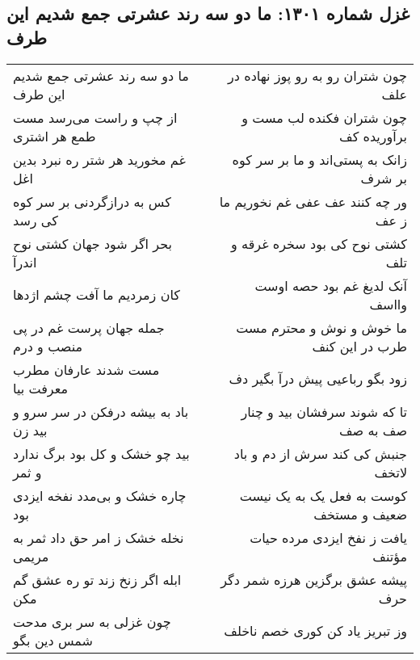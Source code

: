 \begin{center}
\section*{غزل شماره ۱۳۰۱: ما دو سه رند عشرتی جمع شدیم این طرف}
\label{sec:1301}
\begin{longtable}{l p{0.5cm} r}
ما دو سه رند عشرتی جمع شدیم این طرف
&&
چون شتران رو به رو پوز نهاده در علف
\\
از چپ و راست می‌رسد مست طمع هر اشتری
&&
چون شتران فکنده لب مست و برآوریده کف
\\
غم مخورید هر شتر ره نبرد بدین اغل
&&
زانک به پستی‌اند و ما بر سر کوه بر شرف
\\
کس به درازگردنی بر سر کوه کی رسد
&&
ور چه کنند عف عفی غم نخوریم ما ز عف
\\
بحر اگر شود جهان کشتی نوح اندرآ
&&
کشتی نوح کی بود سخره غرقه و تلف
\\
کان زمردیم ما آفت چشم اژدها
&&
آنک لدیغ غم بود حصه اوست وااسف
\\
جمله جهان پرست غم در پی منصب و درم
&&
ما خوش و نوش و محترم مست طرب در این کنف
\\
مست شدند عارفان مطرب معرفت بیا
&&
زود بگو رباعیی پیش درآ بگیر دف
\\
باد به بیشه درفکن در سر سرو و بید زن
&&
تا که شوند سرفشان بید و چنار صف به صف
\\
بید چو خشک و کل بود برگ ندارد و ثمر
&&
جنبش کی کند سرش از دم و باد لاتخف
\\
چاره خشک و بی‌مدد نفخه ایزدی بود
&&
کوست به فعل یک به یک نیست ضعیف و مستخف
\\
نخله خشک ز امر حق داد ثمر به مریمی
&&
یافت ز نفخ ایزدی مرده حیات مؤتنف
\\
ابله اگر زنخ زند تو ره عشق گم مکن
&&
پیشه عشق برگزین هرزه شمر دگر حرف
\\
چون غزلی به سر بری مدحت شمس دین بگو
&&
وز تبریز یاد کن کوری خصم ناخلف
\\
\end{longtable}
\end{center}
